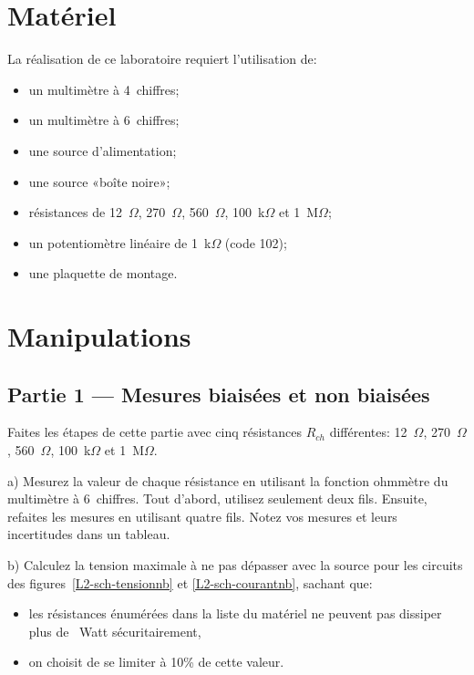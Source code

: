 \documentclass[canadien,12pt,oneside,letterpaper]{article}
\begin{document}
\section{Matériel}

\noindent La réalisation de ce laboratoire requiert l'utilisation de:
\vspace{1ex}
\begin{itemize} \itemsep4pt
\item un multimètre à 4\textonehalf~chiffres;
\item un multimètre à 6\textonehalf~chiffres;
\item une source d'alimentation;
\item une source «boîte noire»;
\item résistances de 12~$\Omega$, 270~$\Omega$, 560~$\Omega$, 100~k$\Omega$ et 1~M$\Omega$;
\item un potentiomètre linéaire de 1~k$\Omega$ (code 102);
\item une plaquette de montage.
\end{itemize}


\section{Manipulations}

\setlength{\parskip}{1ex plus 0.5ex minus 0.2ex}

\subsection{Partie 1 --- Mesures biaisées et non biaisées} \label{sec:part1}

Faites les étapes de cette partie avec cinq résistances $R_{ch}$ différentes: 12~$\Omega$, 270~$\Omega$, 560~$\Omega$, 100~k$\Omega$ et 1~M$\Omega$.

a) Mesurez la valeur de chaque résistance en utilisant la fonction ohmmètre du multimètre à 6\textonehalf~chiffres. Tout d'abord, utilisez seulement deux fils. Ensuite, refaites les mesures en utilisant quatre fils. Notez vos mesures et leurs incertitudes dans un tableau.

b) Calculez la tension maximale à ne pas dépasser avec la source pour les circuits des figures~\ref{L2-sch-tensionnb} et \ref{L2-sch-courantnb}, sachant que: 
    \begin{itemize}
    \item les résistances énumérées dans la liste du matériel ne peuvent pas dissiper plus de \textonequarter~Watt sécuritairement,  
    \item on choisit de se limiter à 10\% de cette valeur.
    \end{itemize}
\vspace{1ex}
\end{document}
